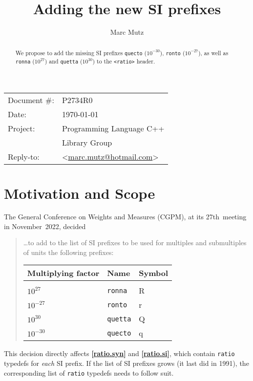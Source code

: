 \documentclass[11pt]{article}
\date{}
\title{Adding the new SI prefixes}
\makeatletter
\newcommand{\emailaddress}{marc.mutz@hotmail.com}
\newcommand{\email}{\href{mailto:\emailaddress}{\emailaddress}}
\newcommand{\wgpaper}[1]{\href{https://wg21.link/#1}{#1}}
\newcommand{\isref}[1]{\textbf{[\wgpaper{#1}]}}
\newcommand{\quecto}{\texttt{quecto}}
\newcommand{\ronto}{\texttt{ronto}}
\newcommand{\ronna}{\texttt{ronna}}
\newcommand{\quetta}{\texttt{quetta}}
\makeatother
\begin{document}
\maketitle\vspace{-2cm}

\begin{tabular}{ll}
  Document \#:&P2734R0\\
  Date:       &\today\\
  Project:    &Programming Language C++\\
              &Library Group\\
  Reply-to:   &\author{Marc Mutz} \textless\email\textgreater
\end{tabular}
\vspace{1cm}
\begin{abstract}
  We propose to add the missing SI prefixes \quecto{} ($10^{-30}$),
  \ronto{} ($10^{-27}$), as well as \ronna{} ($10^{27}$) and \quetta{}
  ($10^{30}$) to the \texttt{<ratio>} header.
\end{abstract}

\section{Motivation and Scope}

The General Conference on Weights and Measures (CGPM), at its
27th~meeting in November~2022, decided \cite{CGPM-22-3}

\begin{quote}
  \ldots to add to the list of SI prefixes to be used for multiples
  and submultiples of units the following prefixes:

  \begin{tabular}{lll}
    Multiplying factor & Name & Symbol\\\hline\\
    $10^{27}$ & \ronna & R\\
    $10^{-27}$ & \ronto & r\\
    $10^{30}$ & \quetta & Q\\
    $10^{-30}$ & \quecto & q\\
  \end{tabular}
\end{quote}

This decision directly affects \isref{ratio.syn} and \isref{ratio.si},
which contain \texttt{ratio} typedefs for \emph{each} SI prefix. If
the list of SI prefixes grows (it last did in 1991), the corresponding
list of \texttt{ratio} typedefs needs to follow suit.
\end{document}
